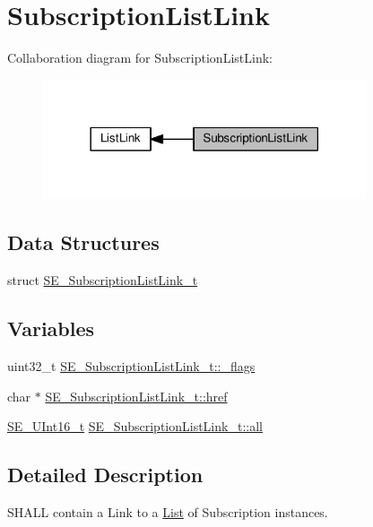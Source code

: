 \hypertarget{group__SubscriptionListLink}{}\section{Subscription\+List\+Link}
\label{group__SubscriptionListLink}
Collaboration diagram for Subscription\+List\+Link\+:\nopagebreak
\begin{figure}[H]
\begin{center}
\leavevmode
\includegraphics[width=270pt]{group__SubscriptionListLink}
\end{center}
\end{figure}
\subsection*{Data Structures}
\begin{DoxyCompactItemize}
\item 
struct \hyperlink{structSE__SubscriptionListLink__t}{S\+E\+\_\+\+Subscription\+List\+Link\+\_\+t}
\end{DoxyCompactItemize}
\subsection*{Variables}
\begin{DoxyCompactItemize}
\item 
uint32\+\_\+t \hyperlink{group__SubscriptionListLink_ga93d00f33f2e0e65549237fbf178db546}{S\+E\+\_\+\+Subscription\+List\+Link\+\_\+t\+::\+\_\+flags}
\item 
char $\ast$ \hyperlink{group__SubscriptionListLink_ga6a3870736e354e4a3b367859752e47e7}{S\+E\+\_\+\+Subscription\+List\+Link\+\_\+t\+::href}
\item 
\hyperlink{group__UInt16_gac68d541f189538bfd30cfaa712d20d29}{S\+E\+\_\+\+U\+Int16\+\_\+t} \hyperlink{group__SubscriptionListLink_gac6bb6b67f2a885facd387ad84674a74b}{S\+E\+\_\+\+Subscription\+List\+Link\+\_\+t\+::all}
\end{DoxyCompactItemize}


\subsection{Detailed Description}
S\+H\+A\+LL contain a Link to a \hyperlink{structList}{List} of Subscription instances. 


